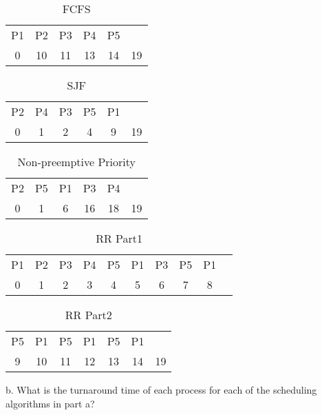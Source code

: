 \documentclass[letterpaper, 10pt,DIV=13]{scrartcl}
\numberwithin{equation}{section} %
\numberwithin{figure}{section} %
\numberwithin{table}{section} %
\begin{document}
\begin{table}[h]
    \centering
    \begin{tabular}{cccccc}
        P1 & P2 & P3 & P4 & P5 & \\
        0  &10  & 11 &  13&  14&19 \\
    \end{tabular}
    \caption{FCFS}
    \label{tab:my_label}
\end{table}
\begin{table}[h]
    \centering
    \begin{tabular}{cccccc}
        P2 & P4 & P3 & P5 & P1 & \\
        0 & 1 & 2 & 4 & 9 & 19\\
    \end{tabular}
    \caption{SJF}
    \label{tab:my_label}
\end{table}
\begin{table}[H]
    \centering
    \begin{tabular}{cccccc}
        P2 & P5 & P1 & P3 & P4 & \\
        0 & 1 & 6 & 16 & 18 & 19\\
    \end{tabular}
    \caption{Non-preemptive Priority}
    \label{tab:my_label}
\end{table}

\begin{table}[H]
    \centering
    \begin{tabular}{cccccccccc}
         P1&  P2&  P3&  P4&  P5&  P1&  P3&  P5&  P1& \\
         0&  1&  2&  3& 4 &  5&  6& 7 &  8& \\
    \end{tabular}
    \caption{RR Part1}
    \label{tab:my_label}
\end{table}
\begin{table}[H]
    \centering
    \begin{tabular}{ccccccc}
         P5& P1&  P5&  P1&  P5&  P1& \\
         9& 10 &11  &12  &13  &14  &19 \\
    \end{tabular}
    \caption{RR Part2}
    \label{tab:my_label}
\end{table}
\pagebreak
b. What is the turnaround time of each process for each of the scheduling algorithms in part a? \\
\end{document}
